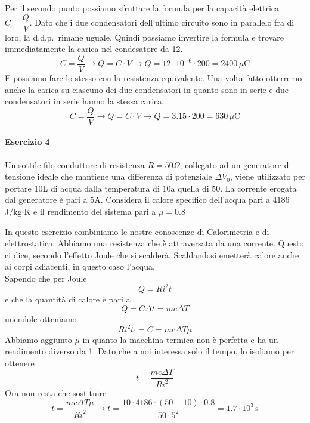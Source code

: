 Per il secondo punto possiamo sfruttare la formula per la capacità elettrica $C = \dfrac{Q}{V}$. Dato
che i due condensatori dell'ultimo circuito sono in parallelo fra di loro, la d.d.p.~rimane uguale. 
Quindi possiamo invertire la formula e trovare immediatamente la carica nel condesatore da 12.
\begin{equation*}
C = \frac{Q}{V} \rightarrow Q = C\cdot V \rightarrow Q = 12\cdot10^{-6}\cdot200 =
\boxed{2400\,\mu\text{C}}
\end{equation*}
E possiamo fare lo stesso con la resistenza equivalente. Una volta fatto otterremo anche la carica su 
ciascuno dei due condensatori in quanto sono in serie e due condensatori in serie hanno la stessa 
carica.
\begin{equation*}
C = \frac{Q}{V} \rightarrow Q = C\cdot V \rightarrow Q = 3.15\cdot200 = \boxed{630\,\mu\text{C}}
\end{equation*}

\paragraph{Esercizio 4}
Un sottile filo conduttore di resistenza $R = 50\Omega$, collegato ad un generatore di tensione
ideale che mantiene una differenza di potenziale $\Delta V_0$, viene utilizzato per portare
$10$L di acqua dalla temperatura di $10$\textdegree a quella di $50$\textdegree. La corrente
erogata dal generatore è pari a $5$A. Considera il calore specifico dell'acqua pari a 
$4186$ J/kg$\cdot$K e il rendimento del sistema pari a $\mu=0.8$
\divisor

In questo esercizio combiniamo le nostre conoscenze di Calorimetria e di elettrostatica. Abbiamo
una resistenza che è attraversata da una corrente. Questo ci dice, secondo l'effetto Joule che 
si scalderà. Scaldandosi emetterà calore anche ai corpi adiacenti, in questo caso l'acqua.\\
Sapendo che per Joule
\begin{equation*}
  Q = Ri^2t
\end{equation*}
e che la quantità di calore è pari a
\begin{equation*}
  Q = C\Delta t = mc\Delta T
\end{equation*}
unendole otteniamo
\begin{equation*}
  Ri^2t\cdot = C= mc\Delta T\mu
\end{equation*}
Abbiamo aggiunto $\mu$ in quanto la macchina termica non è perfetta e ha un rendimento diverso da 
1. Dato che a noi interessa solo il tempo, lo isoliamo per ottenere
\begin{equation*}
  t = \frac{mc\Delta T}{Ri^2} 
\end{equation*}
Ora non resta che sostituire
\begin{equation*}
t = \frac{mc\Delta T\mu}{Ri^2} \rightarrow t =  \frac{10\cdot4186\cdot(50-10)\cdot0.8}{50\cdot5^2}
= \boxed{1.7\cdot10^3\,\text{s}}
\end{equation*}

